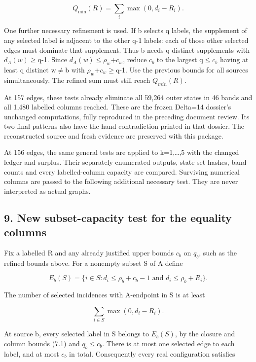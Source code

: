 \documentclass[
  11pt,
]{article}
\begin{document}
\[
Q_{\min}(R)=\sum_i\max(0,d_i-R_i).
\]

One further necessary refinement is used. If b selects q labels, the
supplement of any selected label is adjacent to the other q-1 labels:
each of those other selected edges must dominate that supplement. Thus b
needs q distinct supplements with
\ensuremath{d_A(w)}\ensuremath{\ge}q-1. Since
\ensuremath{d_A(w)}\ensuremath{\le}\ensuremath{\rho _w}+\ensuremath{c_w},
reduce \ensuremath{c_b} to the largest q\ensuremath{\le}\ensuremath{c_b}
having at least q distinct w\ensuremath{\ne}b with
\ensuremath{\rho _w}+\ensuremath{c_w}\ensuremath{\ge}q-1. Use the
previous bounds for all sources simultaneously. The refined sum must
still reach \ensuremath{Q_{min}(R)}.

At 157 edges, these tests already eliminate all 59,264 outer states in
46 bands and all 1,480 labelled columns reached. These are the frozen
Delta=14 dossier's unchanged computations, fully reproduced in the
preceding document review. Its two final patterns also have the hand
contradiction printed in that dossier. The reconstructed source and
fresh evidence are preserved with this package.

At 156 edges, the same general tests are applied to k=1,\ldots,5 with
the changed ledger and surplus. Their separately enumerated outputs,
state-set hashes, band counts and every labelled-column capacity are
compared. Surviving numerical columns are passed to the following
additional necessary test. They are never interpreted as actual graphs.

\hypertarget{new-subset-capacity-test-for-the-equality-columns}{%
\subsection{9. New subset-capacity test for the equality
columns}\label{new-subset-capacity-test-for-the-equality-columns}}

Fix a labelled R and any already justified upper bounds \ensuremath{c_b}
on \ensuremath{q_b}, such as the refined bounds above. For a nonempty
subset S of A define

\[
E_b(S)=\{i\in S:d_i\le\rho _b+c_b-1\text{ and }d_i\le\rho _b+R_i\}.
\]

The number of selected incidences with A-endpoint in S is at least

\[
\sum_{i\in S}\max(0,d_i-R_i).
\]

At source b, every selected label in S belongs to \ensuremath{E_b(S)},
by the closure and column bounds (7.1) and
\ensuremath{q_b}\ensuremath{\le}\ensuremath{c_b}. There is at most one
selected edge to each label, and at most \ensuremath{c_b} in total.
Consequently every real configuration satisfies
\end{document}
